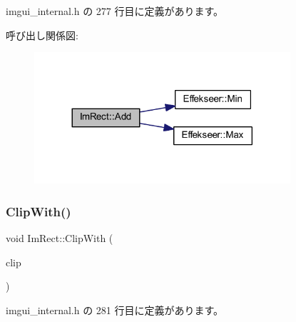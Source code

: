  imgui\+\_\+internal.\+h の 277 行目に定義があります。

呼び出し関係図\+:\nopagebreak
\begin{figure}[H]
\begin{center}
\leavevmode
\includegraphics[width=269pt]{struct_im_rect_a9bcb65fd17843c74555291a522e9ebdf_cgraph}
\end{center}
\end{figure}
\mbox{\label{struct_im_rect_a5e220ababe2fa079638aab8f4b0b8ace}} 
\subsubsection{\texorpdfstring{Clip\+With()}{ClipWith()}}
{\footnotesize\ttfamily void Im\+Rect\+::\+Clip\+With (\begin{DoxyParamCaption}\item[{const \mbox{\hyperlink{struct_im_rect}{Im\+Rect}} \&}]{clip }\end{DoxyParamCaption})\hspace{0.3cm}{\ttfamily [inline]}}



 imgui\+\_\+internal.\+h の 281 行目に定義があります。

